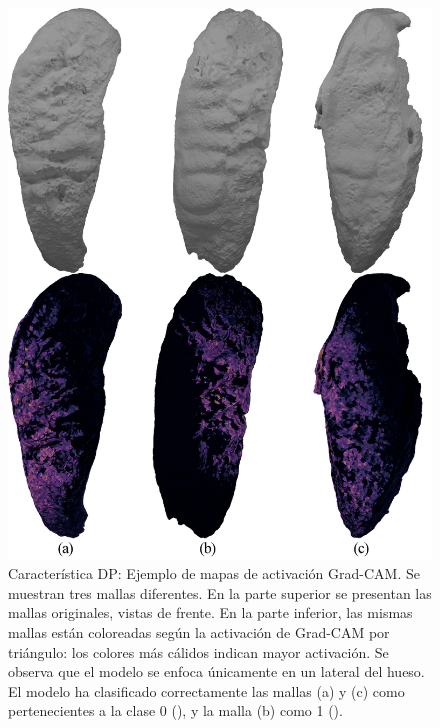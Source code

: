 \begin{figure}[htbp]
    \centering
    \includegraphics[width=\linewidth]{figures/5_experiments/grad-cam-DP-samples.png}
    \caption[Característica DP: Ejemplo de mapas de activación Grad-CAM]{Característica DP: Ejemplo de mapas de activación Grad-CAM. Se muestran tres mallas diferentes. En la parte superior se presentan las mallas originales, vistas de frente. En la parte inferior, las mismas mallas están coloreadas según la activación de Grad-CAM por triángulo: los colores más cálidos indican mayor activación. Se observa que el modelo se enfoca únicamente en un lateral del hueso. El modelo ha clasificado correctamente las mallas (a) y (c) como pertenecientes a la clase 0 (), y la malla (b) como 1 ().}
    \label{fig5:grad_cam__DP_samples}
\end{figure}